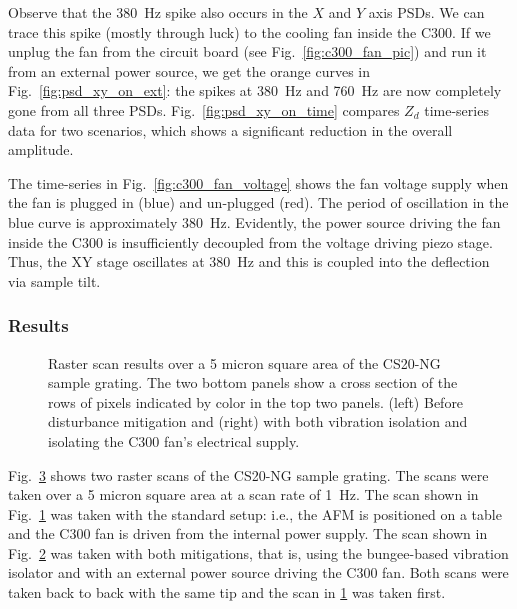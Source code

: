 Observe that the 380~Hz spike also occurs in the $X$ and $Y$ axis PSDs. We can trace this spike (mostly through luck) to the cooling fan inside the C300. If we unplug the fan from the circuit board (see Fig.~\ref{fig:c300_fan_pic}) and run it from an external power source, we get the orange curves in Fig.~\ref{fig:psd_xy_on_ext}: the spikes at 380~Hz and 760~Hz are now completely gone from all three PSDs. Fig.~\ref{fig:psd_xy_on_time} compares $Z_d$ time-series data for two scenarios, which shows a significant reduction in the overall amplitude.

The time-series in Fig.~\ref{fig:c300_fan_voltage} shows the fan voltage supply when the fan is plugged in (blue) and un-plugged (red). The period of oscillation in the blue curve is approximately 380~Hz. Evidently, the power source driving the fan inside the C300 is insufficiently decoupled from the voltage driving piezo stage. Thus, the XY stage oscillates at 380~Hz and this is coupled into the deflection via sample tilt.

\subsubsection{Results}\label{sec:bungee_results}
\begin{figure}[t!]
  \begin{subfigure}{.48\textwidth}
    
    \caption{}
    \label{fig:raster_no_bung}
  \end{subfigure}
  \begin{subfigure}{.48\textwidth}
    
    \caption{ }
    \label{fig:raster_with_bung}
  \end{subfigure}
  \caption{Raster scan results over a 5 micron square area of the CS20-NG sample grating. The two bottom panels show a cross section of the rows of pixels indicated by color in the top two panels. (left) Before disturbance mitigation and (right) with both vibration isolation and isolating the C300 fan's electrical supply.}
  \label{fig:raster_dist_results}
\end{figure}
Fig.~\ref{fig:raster_dist_results} shows two raster scans of the CS20-NG sample grating. The scans were taken over a 5 micron square area at a scan rate of 1~Hz. The scan shown in Fig.~\ref{fig:raster_no_bung} was taken with the standard setup: i.e., the AFM is positioned on a table and the C300 fan is driven from the internal power supply. The scan shown in Fig.~\ref{fig:raster_with_bung} was taken with both mitigations, that is, using the bungee-based vibration isolator and with an external power source driving the C300 fan. Both scans were taken back to back with the same tip and the scan in \ref{fig:raster_no_bung} was taken first.

